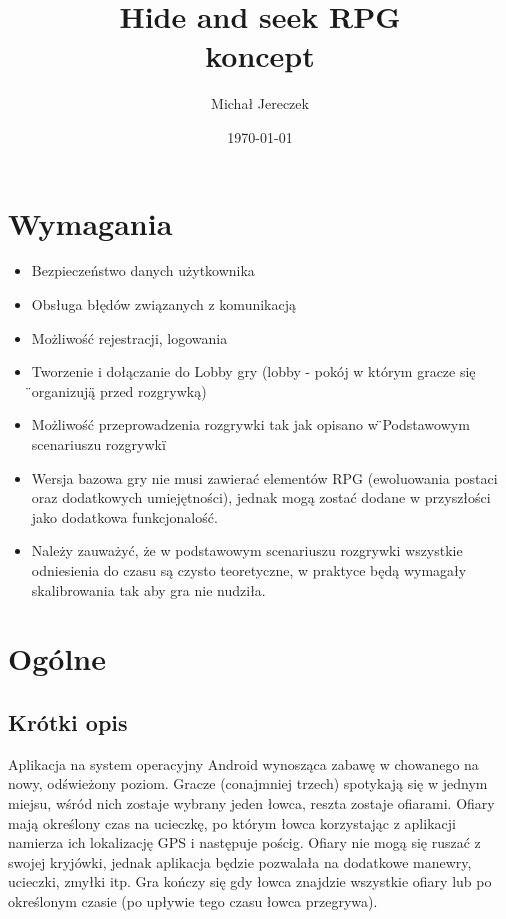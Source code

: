 \documentclass[a4paper,11pt,notitlepage]{article}
\author{Michał Jereczek}
\title{ Hide and seek RPG \\ {\small koncept}}
\date{\today}
\begin{document}
\maketitle
\tableofcontents
\pagebreak

\section{Wymagania}
\begin{itemize}
\item Bezpieczeństwo danych użytkownika
\item Obsługa błędów związanych z komunikacją
\item Możliwość rejestracji, logowania
\item Tworzenie i dołączanie do Lobby gry
(lobby - pokój w którym gracze się \"{}organizują\"{} przed rozgrywką)
\item Możliwość przeprowadzenia rozgrywki tak jak opisano w \"{}Podstawowym scenariuszu rozgrywki\"{}
\item Wersja bazowa gry nie musi zawierać elementów RPG (ewoluowania postaci oraz dodatkowych umiejętności), jednak mogą zostać dodane w przyszłości jako dodatkowa funkcjonalość.
\item Należy zauważyć, że w podstawowym scenariuszu rozgrywki wszystkie odniesienia do czasu są czysto teoretyczne, w praktyce będą wymagały skalibrowania tak aby gra nie nudziła.

\end{itemize}

\section{Ogólne}
\subsection{Krótki opis}
Aplikacja na system operacyjny Android wynosząca zabawę w chowanego na nowy, odświeżony poziom. Gracze (conajmniej trzech) spotykają się w jednym miejsu, wśród nich zostaje wybrany jeden łowca, reszta zostaje ofiarami. Ofiary mają określony czas na ucieczkę, po którym łowca korzystając z aplikacji namierza ich lokalizację GPS i następuje pościg. Ofiary nie mogą się ruszać z swojej kryjówki, jednak aplikacja będzie pozwalała na dodatkowe manewry, ucieczki, zmyłki itp. Gra kończy się gdy łowca znajdzie wszystkie ofiary lub po określonym czasie (po upływie tego czasu łowca przegrywa).
\end{document}

